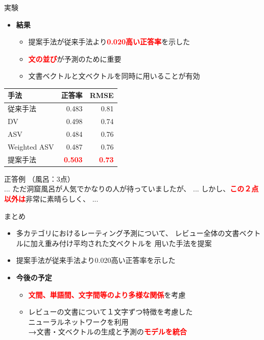 \documentclass[unicode,10pt]{beamer}
\newlength{\mycolumnwidth}
\newcommand{\arrow}{\textcolor{ttiblue}{\textbf{→}}\hspace{1ex}}
\newcommand{\itemtitle}[1]{\textbf{#1}\\}
\newcommand{\fire}[1]{\textcolor{red}{\textbf{#1}}}
\newcommand{\doublecolumns}[4]{
    \begin{minipage}[t]{#1}
      #2
    \end{minipage}
    \begin{minipage}[t]{#3}
      #4
    \end{minipage}}
\begin{document}
\begin{frame}[t]
\begin{columns}[onlytextwidth,t]
\begin{column}{\mycolumnwidth}
\begin{block}{実験}
      \begin{itemize}
        \item \itemtitle{結果}
          \begin{itemize}
            \item 提案手法が従来手法より\fire{0.020高い正答率}を示した
            \item \fire{文の並び}が予測のために重要
            \item 文書ベクトルと文ベクトルを同時に用いることが有効
          \end{itemize}
      \end{itemize}
    \doublecolumns{0.575\textwidth}{
      \begin{table}
        \centering
        \begin{tabular}{l | r r}
          手法 & 正答率 & RMSE \\
          \hline
          従来手法\cite{fujitani15} & 0.483 & 0.81 \\
          DV & 0.498 & 0.74 \\
          ASV & 0.484 & 0.76 \\
          Weighted ASV & 0.487 & 0.76 \\
          提案手法 & \fire{0.503} & \fire{0.73} \\
        \end{tabular}
      \end{table}
    }{0.4\textwidth}{
      \vspace{0.125em} %
      正答例 （風呂：3点） \\
      ...
      ただ洞窟風呂が人気でかなりの人が待っていましたが、
      ...
      しかし、\fire{この２点以外は}非常に素晴らしく、
      ...
    }
  \end{block}

  \begin{block}{まとめ}
    \begin{itemize}
      \item 多カテゴリにおけるレーティング予測について、
            レビュー全体の文書ベクトルに加え重み付け平均された文ベクトルを
            用いた手法を提案
      \item 提案手法が従来手法\cite{fujitani15}より0.020高い正答率を示した
      \item \itemtitle{今後の予定}
        \begin{itemize}
          \item \fire{文間、単語間、文字間等のより多様な関係}を考慮
          \item レビューの文書について１文字ずつ特徴を考慮した\\
                ニューラルネットワークを利用 \\
                \arrow 文書・文ベクトルの生成と予測の\fire{モデルを統合}
        \end{itemize}
    \end{itemize}
  \end{block}


\end{column}
\end{columns}
\end{frame}
\end{document}

